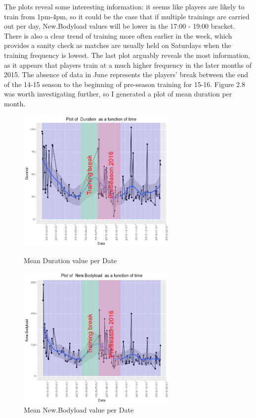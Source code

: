 \begin{figure}[h]
\begin{minipage}{.32\textwidth}
		\caption{}
	\end{minipage}
\end{figure}
\break\hfill
\newline
The plots reveal some interesting information: it seems like players are likely to train from 1pm-4pm, so it could be the case that if multiple trainings are carried out per day, New.Bodyload values will be lower in the 17:00 - 19:00 bracket. There is also a clear trend of training more often earlier in the week, which provides a sanity check as matches are usually held on Saturdays when the training frequency is lowest. The last plot arguably reveals the most information, as it appears that players train at a much higher frequency in the later months of 2015. The absence of data in June represents the players' break between the end of the 14-15 season to the beginning of pre-season training for 15-16. Figure 2.8 was worth investigating further, so I generated a plot of mean duration per month.\hfill\break
\newline
\begin{figure}[h]
	\centering
	\begin{minipage}{.48\textwidth}
		\centering
		\includegraphics[width=1\linewidth, height=7cm]{Images/DurationForSeason.png}
		\caption{Mean Duration value per Date}
	\end{minipage} %
	\begin{minipage}{.48\textwidth}
		\centering
		\includegraphics[width=1\linewidth, height=7cm]{Images/NBLTime.png}
		\caption{Mean New.Bodyload value per Date}
	\end{minipage} 
\end{figure}
